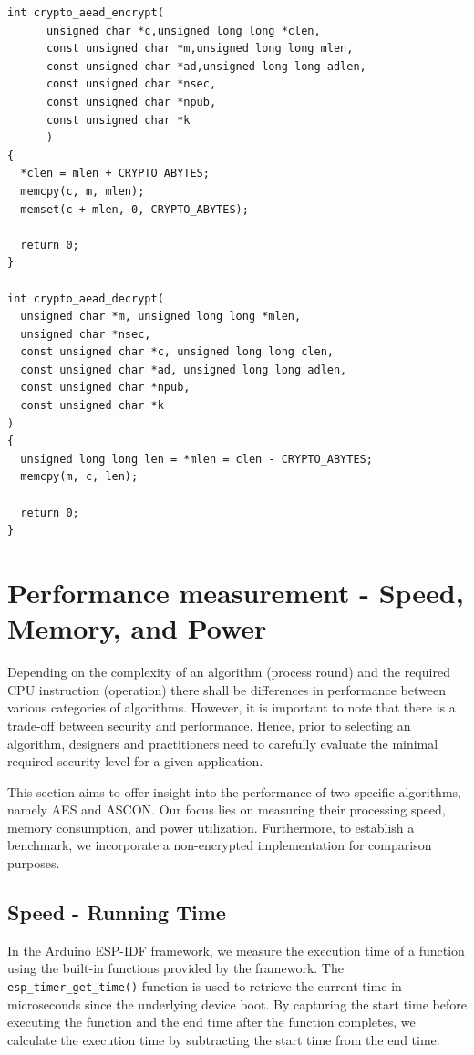 \begin{lstlisting}[style=CStyle, caption={C Implementation Of No-Encryption - Base Line Reference of Measurement}, label={list:no-enc}]
int crypto_aead_encrypt(
      unsigned char *c,unsigned long long *clen,
      const unsigned char *m,unsigned long long mlen,
      const unsigned char *ad,unsigned long long adlen,
      const unsigned char *nsec,
      const unsigned char *npub,
      const unsigned char *k
      )
{
  *clen = mlen + CRYPTO_ABYTES;
  memcpy(c, m, mlen);
  memset(c + mlen, 0, CRYPTO_ABYTES);

  return 0;
}

int crypto_aead_decrypt(
  unsigned char *m, unsigned long long *mlen,
  unsigned char *nsec,
  const unsigned char *c, unsigned long long clen,
  const unsigned char *ad, unsigned long long adlen,
  const unsigned char *npub,
  const unsigned char *k
)
{
  unsigned long long len = *mlen = clen - CRYPTO_ABYTES;
  memcpy(m, c, len);

  return 0;
} 
\end{lstlisting}


\section{Performance measurement - Speed, Memory, and Power}
Depending on the complexity of an algorithm (process round) and the required CPU instruction (operation) there shall be differences in performance between various categories of algorithms. However, it is important to note that there is a trade-off between security and performance. Hence, prior to selecting an algorithm, designers and practitioners need to carefully evaluate the minimal required security level for a given application. 

This section aims to offer insight into the performance of two specific algorithms, namely AES and ASCON. Our focus lies on measuring their processing speed, memory consumption, and power utilization. Furthermore, to establish a benchmark, we incorporate a non-encrypted implementation for comparison purposes.

\subsection{Speed - Running Time}
% 
In the Arduino ESP-IDF framework, we measure the execution time of a function using the built-in functions provided by the framework. The \texttt{esp\_timer\_get\_time()} function is used to retrieve the current time in microseconds since the underlying device boot. By capturing the start time before executing the function and the end time after the function completes, we calculate the execution time by subtracting the start time from the end time.

